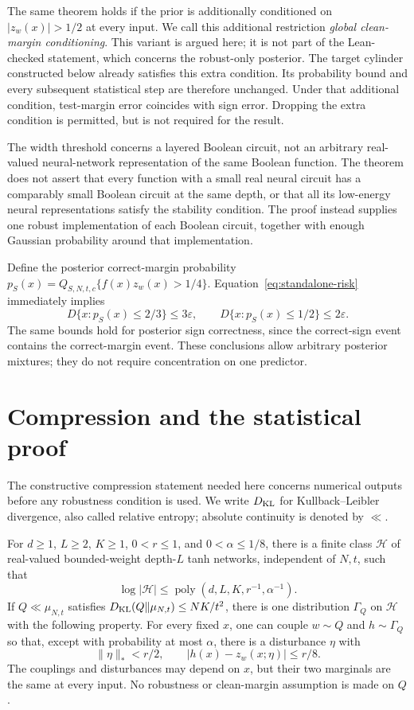 The same theorem holds if the prior is additionally conditioned on
$|z_w(x)|>1/2$ at every input. We call this additional restriction
\emph{global clean-margin conditioning}. This variant is argued here;
it is not part of the Lean-checked
statement, which concerns the robust-only posterior. The target cylinder constructed below already satisfies this extra
condition. Its probability bound and every subsequent statistical step are
therefore unchanged. Under that additional condition, test-margin error
coincides with sign error. Dropping the extra condition is permitted, but is
not required for the result.

The width threshold concerns a layered Boolean circuit, not an arbitrary
real-valued neural-network representation of the same Boolean function.
The theorem does not assert that every function with a small real neural
circuit has a comparably small Boolean circuit at the same depth, or that
all its low-energy neural representations satisfy the stability condition.
The proof instead supplies one robust implementation of each Boolean
circuit, together with enough Gaussian probability around that implementation.

Define the posterior correct-margin probability
$p_S(x)=Q_{S,N,t,c}\{f(x)z_w(x)>1/4\}$.
Equation~\eqref{eq:standalone-risk} immediately implies
\[
 D\{x:p_S(x)\le2/3\}\le3\varepsilon,
 \qquad D\{x:p_S(x)\le1/2\}\le2\varepsilon.
\]
The same bounds hold for posterior sign correctness, since the correct-sign
event contains the correct-margin event. These conclusions allow arbitrary
posterior mixtures; they do not require concentration on one predictor.

\section{Compression and the statistical proof}
\label{sec:theory-statistical}

The constructive compression statement needed here concerns numerical
outputs before any robustness condition is used. We write
$D_{\rm KL}$ for Kullback--Leibler divergence, also called relative
entropy; absolute continuity is denoted by $\ll$.

\begin{lemma}
\label{lem:raw-entropy-compression}
For $d\ge1$, $L\ge2$, $K\ge1$, $0<r\le1$, and
$0<\alpha\le1/8$, there is a finite class $\mathcal H$ of real-valued
bounded-weight depth-$L$ tanh networks, independent of $N,t$, such that
\[
 \log|\mathcal H|\le
       \operatorname{poly}(d,L,K,r^{-1},\alpha^{-1}).
\]
If $Q\ll\mu_{N,t}$ satisfies
$D_{\rm KL}(Q\Vert\mu_{N,t})\le NK/t^2$, there is one distribution
$\Gamma_Q$ on $\mathcal H$ with the following property. For every fixed
$x$, one can couple $w\sim Q$ and $h\sim\Gamma_Q$ so that, except with
probability at most $\alpha$, there is a disturbance $\eta$ with
\[
 \|\eta\|_*<r/2,\qquad
 |h(x)-z_w(x;\eta)|\le r/8.
\]
The couplings and disturbances may depend on $x$, but their two marginals
are the same at every input. No robustness or clean-margin assumption is
made on $Q$.
\end{lemma}

